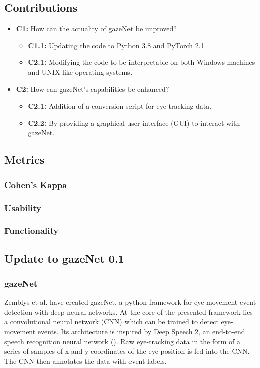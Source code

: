 \documentclass[acmlarge]{acmart}
\begin{document}
\subsection{Contributions}
\begin{itemize}
    \item \textbf{C1:} How can the actuality of gazeNet be improved?
          \begin{itemize}
              \item \textbf{C1.1:} Updating the code to Python 3.8 and PyTorch 2.1.
              \item \textbf{C2.1:} Modifying the code to be interpretable on both Windows-machines and UNIX-like operating systems.
          \end{itemize}
    \item \textbf{C2:} How can gazeNet's capabilities be enhanced?
              \begin{itemize}
              \item \textbf{C2.1:} Addition of a conversion script for eye-tracking data.
              \item \textbf{C2.2:} By providing a graphical user interface (GUI) to interact with gazeNet.
          \end{itemize}
\end{itemize}

\subsection{Metrics}
\subsubsection{Cohen's Kappa}

\subsubsection{Usability}

\subsubsection{Functionality}



\subsection{Update to gazeNet 0.1}
\subsubsection{gazeNet}
Zemblys et al. \cite{zemblys2018gazeNet} have created gazeNet, a python framework for eye-movement event detection with deep neural networks. At the core of the presented framework lies a convolutional neural network (CNN) which can be trained to detect eye-movement events. Its architecture is inspired by Deep Speech 2, an end-to-end speech recognition neural network (\cite{deep_speech_2,zemblys2018gazeNet}). Raw eye-tracking data in the form of a series of samples of x and y coordinates of the eye position is fed into the CNN. The CNN then annotates the data with event labels.
\end{document}
